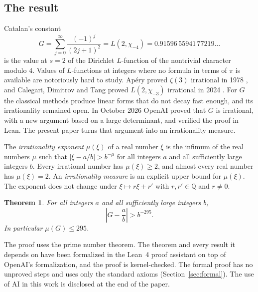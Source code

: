 \documentclass[11pt]{amsart}
\newtheorem{theorem}{Theorem}[section]
\theoremstyle{definition}
\theoremstyle{remark}
\numberwithin{equation}{section}
\newcommand{\Q}{\mathbb Q}
\begin{document}
\subsection{The result}
Catalan's constant
\[
 G=\sum_{j=0}^\infty\frac{(-1)^j}{(2j+1)^2}=L(2,\chi_{-4})=0.91596\,55941\,77219\ldots
\]
is the value at $s=2$ of the Dirichlet $L$-function of the nontrivial character modulo $4$. Values of
$L$-functions at integers where no formula in terms of $\pi$ is available are notoriously hard to study.
Ap\'ery proved $\zeta(3)$ irrational in 1978 \cite{Apery79}, and Calegari, Dimitrov and Tang proved
$L(2,\chi_{-3})$ irrational in 2024 \cite{CDT2024}. For $G$ the classical methods produce linear forms
that do not decay fast enough, and its irrationality remained open. In October 2026 OpenAI
\cite{OpenAI2026} proved that $G$ is irrational, with a new argument based on a large determinant, and
verified the proof in Lean. The present paper turns that argument into an irrationality measure.

The \emph{irrationality exponent} $\mu(\xi)$ of a real number $\xi$ is the infimum of the real numbers
$\mu$ such that $|\xi-a/b|>b^{-\mu}$ for all integers $a$ and all sufficiently large integers $b$. Every
irrational number has $\mu(\xi)\ge2$, and almost every real number has $\mu(\xi)=2$. An
\emph{irrationality measure} is an explicit upper bound for $\mu(\xi)$. The exponent does not change under
$\xi\mapsto r\xi+r'$ with $r,r'\in\Q$ and $r\ne0$.

\begin{theorem}\label{thm:main}
For all integers $a$ and all sufficiently large integers $b$,
\[
 \left|G-\frac ab\right|>b^{-295}.
\]
In particular $\mu(G)\le295$.
\end{theorem}

The proof uses the prime number theorem. The theorem and every result it depends on have been formalized
in the Lean~4 proof assistant on top of OpenAI's formalization, and the proof is kernel-checked. The formal proof has no unproved steps
and uses only the standard axioms (Section~\ref{sec:formal}). The use of AI in this work is disclosed at
the end of the paper.
\end{document}
